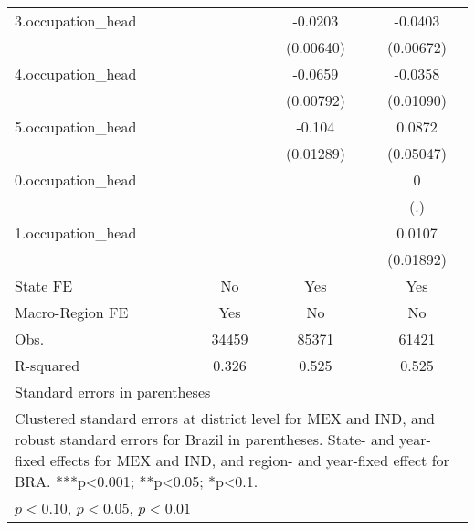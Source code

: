 \begin{table}[htbp]
{\begin{tabular}{l*{3}{c}}
3.occupation_head&                     &     -0.0203\sym{***}&     -0.0403\sym{***}\\
            &                     &   (0.00640)         &   (0.00672)         \\
4.occupation_head&                     &     -0.0659\sym{***}&     -0.0358\sym{***}\\
            &                     &   (0.00792)         &   (0.01090)         \\
5.occupation_head&                     &      -0.104\sym{***}&      0.0872\sym{*}  \\
            &                     &   (0.01289)         &   (0.05047)         \\
0.occupation_head&                     &                     &           0         \\
            &                     &                     &         (.)         \\
1.occupation_head&                     &                     &      0.0107         \\
            &                     &                     &   (0.01892)         \\
State FE    &          No         &         Yes         &         Yes         \\
Macro-Region FE &         Yes         &          No         &          No         \\
\hline
Obs.        &       34459         &       85371         &       61421         \\
R-squared   &       0.326         &       0.525         &       0.525         \\
\hline\hline
\multicolumn{4}{l}{\footnotesize Standard errors in parentheses}\\
\multicolumn{4}{l}{\footnotesize Clustered standard errors at district level for MEX and IND, and robust standard errors for Brazil in parentheses. State- and year-fixed effects for MEX and IND, and region- and year-fixed effect for BRA. ***p<0.001; **p<0.05; *p<0.1.}\\
\multicolumn{4}{l}{\footnotesize \sym{*} \(p<0.10\), \sym{**} \(p<0.05\), \sym{***} \(p<0.01\)}\\
\end{tabular}}
\end{table}

